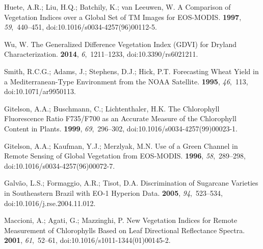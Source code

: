 \documentclass[remotesensing,article,accept,moreauthors,pdftex]{Definitions/mdpi}
\begin{document}
\begin{thebibliography}{999}
Huete, A.R.; Liu, H.Q.; Batchily, K.; {van Leeuwen}, W.
\newblock A Comparison of Vegetation Indices over a Global Set of {{TM}} Images
  for {{EOS}}-{{MODIS}}.
 {\bf 1997}, {\em 59},~440--451, doi:10.1016/s0034-4257(96)00112-5.

Wu, W.
\newblock The {{Generalized Difference Vegetation Index}} ({{GDVI}}) for
  {{Dryland Characterization}}.
 {\bf 2014}, {\em 6},~1211--1233, doi:10.3390/rs6021211.

Smith, R.C.G.; Adams, J.; Stephens, D.J.; Hick, P.T.
\newblock Forecasting Wheat Yield in a {{Mediterranean}}-Type Environment from
  the {{NOAA}} Satellite.
 {\bf 1995}, {\em
  46},~113, doi:10.1071/ar9950113.

Gitelson, A.A.; Buschmann, C.; Lichtenthaler, H.K.
\newblock The {{Chlorophyll Fluorescence Ratio F735}}/{{F700}} as an {{Accurate
  Measure}} of the {{Chlorophyll Content}} in {{Plants}}.
 {\bf 1999}, {\em 69},~296--302, doi:10.1016/s0034-4257(99)00023-1.

Gitelson, A.A.; Kaufman, Y.J.; Merzlyak, M.N.
\newblock Use of a Green Channel in Remote Sensing of Global Vegetation from
  {{EOS}}-{{MODIS}}.
 {\bf 1996}, {\em 58},~289--298, doi:10.1016/s0034-4257(96)00072-7.

Galv{\~a}o, L.S.; Formaggio, A.R.; Tisot, D.A.
\newblock Discrimination of Sugarcane Varieties in {{Southeastern Brazil}} with
  {{EO}}-1 {{Hyperion}} Data.
 {\bf 2005}, {\em 94},~523--534, doi:10.1016/j.rse.2004.11.012.

Maccioni, A.; Agati, G.; Mazzinghi, P.
\newblock New Vegetation Indices for Remote Measurement of Chlorophylls Based
  on Leaf Directional Reflectance Spectra.
 {\bf
  2001}, {\em 61},~52--61, doi:10.1016/s1011-1344(01)00145-2.


\end{thebibliography}
\end{document}
